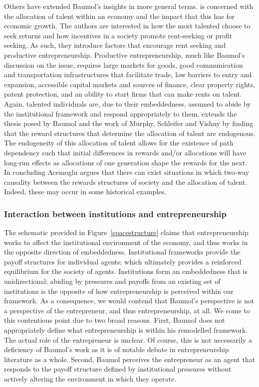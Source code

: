 Others have extended Baumol's insights in more general terms. \citet{Murphy1991} is concerned with the allocation of talent within an economy and the impact that this has for economic growth. The authors are interested in how the most talented choose to seek returns and how incentives in a society promote rent-seeking or profit seeking. As such, they introduce factors that encourage rent seeking and productive entrepreneurship. Productive entrepreneurship, much like Baumol's discussion on the issue, requires large markets for goods, good communication and transportation infrastructures that facilitate trade, low barriers to entry and expansion, accessible capital markets and sources of finance, clear property rights, patent protection, and an ability to start firms that can make rents on talent. Again, talented individuals are, due to their embeddedness, assumed to abide by the institutional framework and respond appropriately to them. \citet{Acemoglu1995} extends the thesis posed by Baumol and the work of Murphy, Schleifer and Vishny by finding that the reward structures that determine the allocation of talent are endogenous. The endogeneity of this allocation of talent allows for the existence of path dependency such that initial differences in rewards and/or allocations will have long-run effects as allocations of one generation shape the rewards for the next. In concluding Acemoglu argues that there can exist situations in which two-way causality between the rewards structures of society and the allocation of talent. Indeed, these may occur in some historical examples.

\subsubsection{Interaction between institutions and entrepreneurship}

The schematic provided in Figure~\ref{spacestructure} claims that entrepreneurship works to affect the institutional environment of the economy, and thus works in the opposite direction of embeddedness. Institutional frameworks provide the payoff structures for individual agents; which ultimately provides a reinforced equilibrium for the society of agents. Institutions form an embeddedness that is unidirectional; abiding by pressures and payoffs from an existing set of institutions is the opposite of how entrepreneurship is perceived within our framework. As a consequence, we would contend that Baumol's perspective is not a perspective of the entrepreneur, and thus entrepreneurship, at all. We come to this contentious point due to two broad reasons. First, Baumol does not appropriately define what entrepreneurship is within his remodelled framework. The actual role of the entrepreneur is unclear. Of course, this is not necessarily a deficiency of Baumol's work as it is of notable debate in entrepreneurship literature as a whole. Second, Baumol perceives the entrepreneur as an agent that responds to the payoff structure defined by institutional pressures without actively altering the environment in which they operate. 

